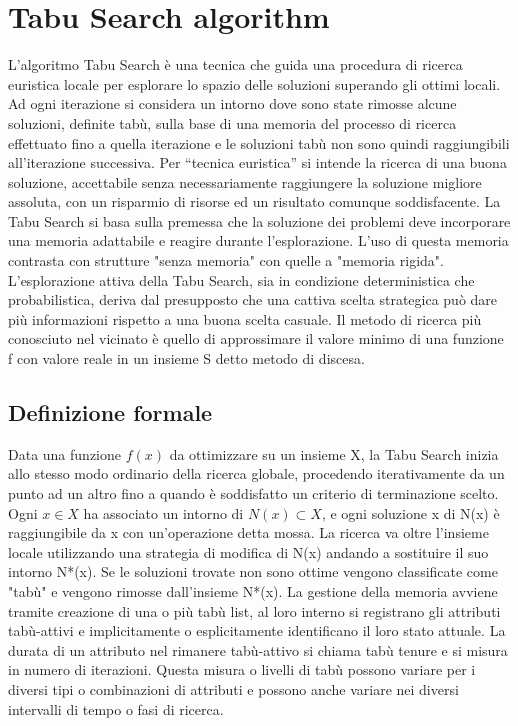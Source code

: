 \documentclass[12pt,a4paper,twoside]{article}
\begin{document}
\section{Tabu Search algorithm}
L'algoritmo Tabu Search è una tecnica che guida una procedura di ricerca euristica locale per esplorare lo spazio delle soluzioni superando gli ottimi locali. Ad
ogni iterazione si considera un intorno dove sono state rimosse alcune soluzioni, definite tabù,
sulla base di una memoria del processo di ricerca effettuato fino a quella iterazione e le
soluzioni tabù non sono quindi raggiungibili all'iterazione successiva. Per “tecnica euristica” si
intende la ricerca di una buona soluzione, accettabile senza necessariamente raggiungere la
soluzione migliore assoluta, con un risparmio di risorse ed un risultato comunque soddisfacente. La Tabu Search si basa sulla premessa che la soluzione dei problemi deve incorporare una memoria adattabile e reagire durante l'esplorazione. L'uso di questa memoria contrasta con strutture "senza memoria" con quelle a "memoria rigida". L'esplorazione attiva della Tabu Search, sia in condizione deterministica che probabilistica, deriva dal presupposto che una cattiva scelta strategica può dare più informazioni rispetto a una buona scelta casuale. Il metodo di ricerca più conosciuto nel vicinato è quello di approssimare il valore minimo di una funzione f con valore reale in un insieme S detto metodo di discesa.
\subsection{Definizione formale}
Data una funzione $f(x)$ da ottimizzare su un insieme X, la Tabu Search inizia allo stesso modo ordinario della ricerca globale, procedendo iterativamente da un punto ad un altro fino a quando è soddisfatto un criterio di terminazione scelto. Ogni $x \in X$ ha associato un intorno di $N(x)\subset X$, e ogni soluzione x di N(x) è raggiungibile da x con un'operazione detta mossa. La ricerca va oltre l'insieme locale utilizzando una strategia di modifica di N(x) andando a sostituire il suo intorno N*(x). Se le soluzioni trovate non sono ottime vengono classificate come "tabù" e vengono rimosse dall'insieme N*(x). La gestione della memoria avviene tramite creazione di una o più tabù list, al loro interno si registrano gli attributi tabù-attivi e implicitamente o esplicitamente identificano il loro stato attuale. La durata di un attributo nel rimanere tabù-attivo si chiama tabù tenure e si misura in numero di iterazioni. Questa misura o livelli di tabù possono variare per i diversi tipi o combinazioni di attributi e possono anche variare nei diversi intervalli di tempo o fasi di ricerca. 
\end{document}
